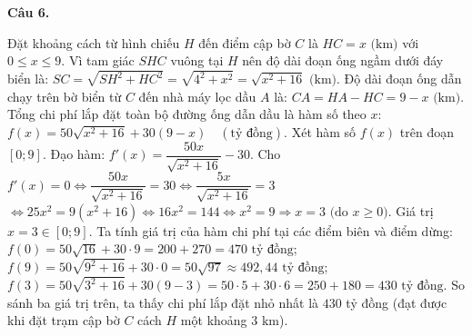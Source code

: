 \documentclass[12pt,a4paper]{article}
\newcommand{\loigiai}[1]{\par\medskip\Needspace{4\baselineskip}\noindent\textbf{#1}\par\nobreak}
\begin{document}
\loigiai{Câu 6.}
Đặt khoảng cách từ hình chiếu $H$ đến điểm cập bờ $C$ là $HC=x\text{ (km)}$ với $0\le x\le 9$.
Vì tam giác $SHC$ vuông tại $H$ nên độ dài đoạn ống ngầm dưới đáy biển là:
$SC=\sqrt{SH^2+HC^2}=\sqrt{4^2+x^2}=\sqrt{x^2+16}\text{ (km)}$.
Độ dài đoạn ống dẫn chạy trên bờ biển từ $C$ đến nhà máy lọc dầu $A$ là:
$CA=HA-HC=9-x\text{ (km)}$.
Tổng chi phí lắp đặt toàn bộ đường ống dẫn dầu là hàm số theo $x$:
$f(x)=50\sqrt{x^2+16}+30(9-x)\quad (\text{tỷ đồng})$.
Xét hàm số $f(x)$ trên đoạn $[0;9]$. Đạo hàm:
$f'(x)=\dfrac{50x}{\sqrt{x^2+16}}-30$.
Cho $f'(x)=0\Leftrightarrow \dfrac{50x}{\sqrt{x^2+16}}=30\Leftrightarrow \dfrac{5x}{\sqrt{x^2+16}}=3$
$\Leftrightarrow 25x^2=9(x^2+16)\Leftrightarrow 16x^2=144\Leftrightarrow x^2=9\Rightarrow x=3\text{ (do } x\ge 0\text{)}$.
Giá trị $x=3\in[0;9]$.
Ta tính giá trị của hàm chi phí tại các điểm biên và điểm dừng:
$f(0)=50\sqrt{16}+30\cdot 9=200+270=470\text{ tỷ đồng}$;
$f(9)=50\sqrt{9^2+16}+30\cdot 0=50\sqrt{97}\approx 492{,}44\text{ tỷ đồng}$;
$f(3)=50\sqrt{3^2+16}+30(9-3)=50\cdot 5+30\cdot 6=250+180=430\text{ tỷ đồng}$.
So sánh ba giá trị trên, ta thấy chi phí lắp đặt nhỏ nhất là $430$ tỷ đồng (đạt được khi đặt trạm cập bờ $C$ cách $H$ một khoảng $3\text{ km}$).
\end{document}
